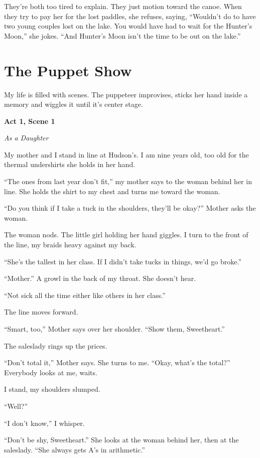 \documentclass[twoside,10pt]{book}
\begin{document}
They're both too tired to explain. They just motion toward the canoe.
When they try to pay her for the lost paddles, she refuses, saying,
``Wouldn't do to have two young couples lost on the lake. You would have
had to wait for the Hunter's Moon,'' she jokes. ``And Hunter's Moon
isn't the time to be out on the lake.''



\cleardoublepage
\chapter{The Puppet Show}

My life is filled with scenes. The puppeteer improvises, sticks her hand
inside a memory and wiggles it until it's center stage.

\textbf{Act 1, Scene 1}

\emph{As a Daughter}

My mother and I stand in line at Hudson's. I am nine years old, too old
for the thermal under­shirts she holds in her hand.

``The ones from last year don't fit,'' my mother says to the woman
behind her in line. She holds the shirt to my chest and turns me toward
the woman.

``Do you think if I take a tuck in the shoulders, they'll be okay?''
Mother asks the woman.

The woman nods. The little girl holding her hand giggles. I turn to the
front of the line, my braids heavy against my back.

``She's the tallest in her class. If I didn't take tucks in things, we'd
go broke.''

``Mother.'' A growl in the back of my throat. She doesn't hear.

``Not sick all the time either like others in her class.''

The line moves forward.

``Smart, too,'' Mother says over her shoulder. ``Show them,
Sweetheart.''

The saleslady rings up the prices.

``Don't total it,'' Mother says. She turns to me. ``Okay, what's the
total?'' Everybody looks at me, waits.

I stand, my shoulders slumped.

``Well?''

``I don't know,'' I whisper.

``Don't be shy, Sweetheart.'' She looks at the woman behind her, then at
the saleslady. ``She always gets A's in arithmetic.''
\end{document}
